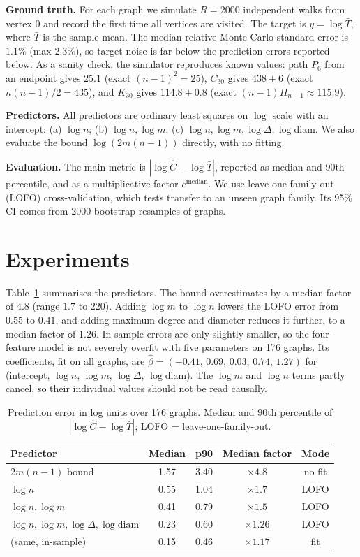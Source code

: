 \documentclass[10pt,twocolumn]{article}
\begin{document}
\textbf{Ground truth.} For each graph we simulate $R=2000$ independent walks from vertex $0$ and record the first time all vertices are visited. The target is $y=\log \bar{T}$, where $\bar{T}$ is the sample mean. The median relative Monte Carlo standard error is $1.1\%$ (max $2.3\%$), so target noise is far below the prediction errors reported below. As a sanity check, the simulator reproduces known values: path $P_6$ from an endpoint gives $25.1$ (exact $(n-1)^2=25$), $C_{30}$ gives $438\pm 6$ (exact $n(n-1)/2=435$), and $K_{30}$ gives $114.8\pm0.8$ (exact $(n-1)H_{n-1}\approx115.9$).

\textbf{Predictors.} All predictors are ordinary least squares on $\log$ scale with an intercept:
(a) $\log n$; (b) $\log n,\log m$; (c) $\log n,\log m,\log \Delta,\log \mathrm{diam}$. We also evaluate the bound $\log(2m(n-1))$ directly, with no fitting.

\textbf{Evaluation.} The main metric is $|\log \hat{C}-\log \bar{T}|$, reported as median and 90th percentile, and as a multiplicative factor $e^{\text{median}}$. We use leave-one-family-out (LOFO) cross-validation, which tests transfer to an unseen graph family. Its 95\% CI comes from 2000 bootstrap resamples of graphs.

\section{Experiments}
Table~\ref{tab:main} summarises the predictors. The bound overestimates by a median factor of $4.8$ (range $1.7$ to $220$). Adding $\log m$ to $\log n$ lowers the LOFO error from $0.55$ to $0.41$, and adding maximum degree and diameter reduces it further, to a median factor of $1.26$. In-sample errors are only slightly smaller, so the four-feature model is not severely overfit with five parameters on 176 graphs. Its coefficients, fit on all graphs, are $\hat\beta=(-0.41,\,0.69,\,0.03,\,0.74,\,1.27)$ for (intercept, $\log n$, $\log m$, $\log\Delta$, $\log\mathrm{diam}$). The $\log m$ and $\log n$ terms partly cancel, so their individual values should not be read causally.

\begin{table}[t]
\centering\small
\caption{Prediction error in log units over 176 graphs. Median and 90th percentile of $|\log\hat C-\log\bar T|$; LOFO = leave-one-family-out.}
\label{tab:main}
\begin{tabular}{lcccc}
\toprule
Predictor & Median & p90 & Median factor & Mode \\
\midrule
$2m(n-1)$ bound & 1.57 & 3.40 & $\times4.8$ & no fit \\
$\log n$ & 0.55 & 1.04 & $\times1.7$ & LOFO \\
$\log n,\log m$ & 0.41 & 0.79 & $\times1.5$ & LOFO \\
$\log n,\log m,\log\Delta,\log\mathrm{diam}$ & 0.23 & 0.60 & $\times1.26$ & LOFO \\
\quad (same, in-sample) & 0.15 & 0.46 & $\times1.17$ & fit \\
\bottomrule
\end{tabular}
\end{table}
\end{document}
